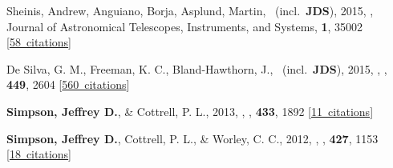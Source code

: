 \item[{\color{numcolor}\scriptsize4}] Sheinis, Andrew, Anguiano, Borja, Asplund, Martin, \etal\ (incl.\ \textbf{JDS}), 2015, , Journal of Astronomical Telescopes, Instruments, and Systems, \textbf{1}, 35002 [\href{https://ui.adsabs.harvard.edu/#abs/2015JATIS...1c5002S}{58~citations}]

\item[{\color{numcolor}\scriptsize3}] De Silva, G. M., Freeman, K. C., Bland-Hawthorn, J., \etal\ (incl.\ \textbf{JDS}), 2015, , \mnras, \textbf{449}, 2604 [\href{https://ui.adsabs.harvard.edu/#abs/2015MNRAS.449.2604D}{560~citations}]

\item[{\color{numcolor}\scriptsize2}] \textbf{Simpson, Jeffrey D.}, \& Cottrell, P. L., 2013, , \mnras, \textbf{433}, 1892 [\href{https://ui.adsabs.harvard.edu/#abs/2013MNRAS.433.1892S}{11~citations}]

\item[{\color{numcolor}\scriptsize1}] \textbf{Simpson, Jeffrey D.}, Cottrell, P. L., \& Worley, C. C., 2012, , \mnras, \textbf{427}, 1153 [\href{https://ui.adsabs.harvard.edu/#abs/2012MNRAS.427.1153S}{18~citations}]
